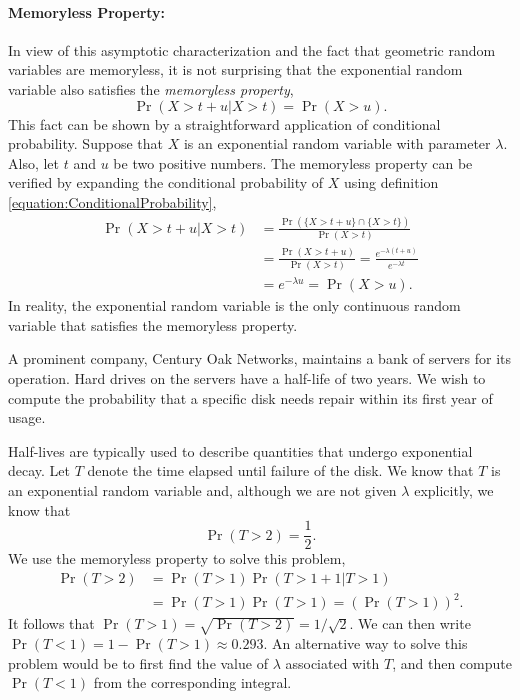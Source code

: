 \paragraph{Memoryless Property:}
In view of this asymptotic characterization and the fact that geometric random variables are memoryless, it is not surprising that the exponential random variable also satisfies the \emph{memoryless property}, 
\begin{equation*}
\Pr (X > t + u | X > t) = \Pr (X > u).
\end{equation*}
This fact can be shown by a straightforward application of conditional probability.
Suppose that $X$ is an exponential random variable with parameter $\lambda$.
Also, let $t$ and $u$ be two positive numbers.
The memoryless property can be verified by expanding the conditional probability of $X$ using definition \eqref{equation:ConditionalProbability},
\begin{equation*}
\begin{split}
\Pr (X > t + u | X > t)
&= \frac{\Pr( \{ X > t + u \} \cap \{ X > t \} ) }{ \Pr ( X > t ) } \\
&= \frac{\Pr( X > t + u ) }{ \Pr ( X > t ) }
= \frac{e^{- \lambda (t + u)} }{ e^{- \lambda t } } \\
&= e^{- \lambda u } = \Pr (X > u).
\end{split}
\end{equation*}
In reality, the exponential random variable is the only continuous random variable that satisfies the memoryless property.

\begin{example}
A prominent company, Century Oak Networks, maintains a bank of servers for its operation.
Hard drives on the servers have a half-life of two years.
We wish to compute the probability that a specific disk needs repair within its first year of usage.

Half-lives are typically used to describe quantities that undergo exponential decay.
Let $T$ denote the time elapsed until failure of the disk.
We know that $T$ is an exponential random variable and, although we are not given $\lambda$ explicitly, we know that
\begin{equation*}
\Pr ( T > 2 ) = \frac{1}{2} .
\end{equation*}
We use the memoryless property to solve this problem,
\begin{equation*}
\begin{split}
\Pr (T > 2) &= \Pr (T > 1) \Pr (T > 1 + 1 | T > 1) \\
&= \Pr (T > 1) \Pr (T > 1)
= \left( \Pr(T > 1) \right)^2 .
\end{split}
\end{equation*}
It follows that $\Pr (T > 1) = \sqrt{ \Pr (T > 2) } = 1 / \sqrt{2}$.
We can then write $\Pr (T < 1) = 1 - \Pr (T > 1) \approx 0.293$.
An alternative way to solve this problem would be to first find the value of $\lambda$ associated with $T$, and then compute $\Pr (T < 1)$ from the corresponding integral.
\end{example}


